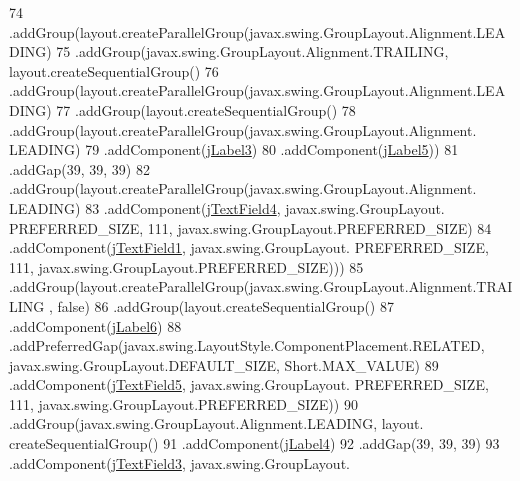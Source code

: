 \begin{DoxyCode}
74                 .addGroup(layout.createParallelGroup(javax.swing.GroupLayout.Alignment.LEADING)
75                     .addGroup(javax.swing.GroupLayout.Alignment.TRAILING, layout.createSequentialGroup()
76                         .addGroup(layout.createParallelGroup(javax.swing.GroupLayout.Alignment.LEADING)
77                             .addGroup(layout.createSequentialGroup()
78                                 .addGroup(layout.createParallelGroup(javax.swing.GroupLayout.Alignment.
      LEADING)
79                                     .addComponent(\mbox{\hyperlink{classsoftware_1_1registrar_ab18af739a7842cf44586f9f1ccf4cb5d}{jLabel3}})
80                                     .addComponent(\mbox{\hyperlink{classsoftware_1_1registrar_a8155b7123176cb4088549ac2325f25f4}{jLabel5}}))
81                                 .addGap(39, 39, 39)
82                                 .addGroup(layout.createParallelGroup(javax.swing.GroupLayout.Alignment.
      LEADING)
83                                     .addComponent(\mbox{\hyperlink{classsoftware_1_1registrar_a439caf9553404d6b620bd02d9dd6c644}{jTextField4}}, javax.swing.GroupLayout.
      PREFERRED\_SIZE, 111, javax.swing.GroupLayout.PREFERRED\_SIZE)
84                                     .addComponent(\mbox{\hyperlink{classsoftware_1_1registrar_a530c642d7e5cc327ce37e22d77ae4172}{jTextField1}}, javax.swing.GroupLayout.
      PREFERRED\_SIZE, 111, javax.swing.GroupLayout.PREFERRED\_SIZE)))
85                             .addGroup(layout.createParallelGroup(javax.swing.GroupLayout.Alignment.TRAILING
      , \textcolor{keyword}{false})
86                                 .addGroup(layout.createSequentialGroup()
87                                     .addComponent(\mbox{\hyperlink{classsoftware_1_1registrar_a613b33aab588faff234599788161a0aa}{jLabel6}})
88                                     .addPreferredGap(javax.swing.LayoutStyle.ComponentPlacement.RELATED, 
      javax.swing.GroupLayout.DEFAULT\_SIZE, Short.MAX\_VALUE)
89                                     .addComponent(\mbox{\hyperlink{classsoftware_1_1registrar_a02ef72d4de1e5346b47314c18049f0ba}{jTextField5}}, javax.swing.GroupLayout.
      PREFERRED\_SIZE, 111, javax.swing.GroupLayout.PREFERRED\_SIZE))
90                                 .addGroup(javax.swing.GroupLayout.Alignment.LEADING, layout.
      createSequentialGroup()
91                                     .addComponent(\mbox{\hyperlink{classsoftware_1_1registrar_a1cc93efa5caf9078801eef6056e86867}{jLabel4}})
92                                     .addGap(39, 39, 39)
93                                     .addComponent(\mbox{\hyperlink{classsoftware_1_1registrar_ac033f6f71314c40dbfb8d1925cc363f5}{jTextField3}}, javax.swing.GroupLayout.

\end{DoxyCode}
